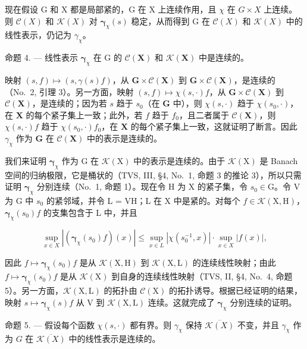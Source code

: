 现在假设 G 和 X 都是局部紧的，G 在 X 上连续作用，且 \(\chi\) 在 \(G \times X\) 上连续。则 \(\mathcal{C}(X)\) 和 \(\mathcal{K}(X)\) 对 \(\boldsymbol{\gamma}_{\chi}(s)\) 稳定，从而得到 G 在 \(\mathcal{C}(X)\) 和 \(\mathcal{K}(X)\) 中的线性表示，仍记为 \(\gamma_{\chi}\)。

命题 4. --- 线性表示 \(\pmb{\gamma}_{\chi}\) 在 G 的 \(\mathcal{C}(\mathbf{X})\) 和 \(\mathcal{K}(\mathbf{X})\) 中是连续的。

映射 \((s, f) \mapsto (s, \gamma(s)f)\)，从 \(\mathbf{G} \times \mathcal{C}(\mathbf{X})\) 到 \(\mathbf{G} \times \mathcal{C}(\mathbf{X})\)，是连续的（No.~2, 引理 3）。另一方面，映射 \((s, f) \mapsto \chi(s, \cdot)f\)，从 \(\mathbf{G} \times \mathcal{C}(\mathbf{X})\) 到 \(\mathcal{C}(\mathbf{X})\)，是连续的；因为若 \(s\) 趋于 \(s_0\)（在 \(\mathbf{G}\) 中），则 \(\chi(s, \cdot)\) 趋于 \(\chi(s_0, \cdot)\)，在 \(\mathbf{X}\) 的每个紧子集上一致；此外，若 \(f\) 趋于 \(f_0\)，且二者属于 \(\mathcal{C}(\mathbf{X})\)，则 \(\chi(s, \cdot)f\) 趋于 \(\chi(s_0, \cdot)f_0\)，在 \(\mathbf{X}\) 的每个紧子集上一致，这就证明了断言。因此 \(\gamma_{\chi}\) 作为 \(\mathbf{G}\) 在 \(\mathcal{C}(\mathbf{X})\) 中的表示是连续的。

我们来证明 \(\pmb{\gamma}_{\chi}\) 作为 G 在 \(\mathcal{K}(\mathrm{X})\) 中的表示是连续的。由于 \(\mathcal{K}(\mathrm{X})\) 是 Banach 空间的归纳极限，它是桶状的（TVS, III, §4, No.~1, 命题 3 的推论 3），所以只需证明 \(\pmb{\gamma}_{\chi}\) 分别连续（No.~1, 命题 1）。现在令 H 为 X 的紧子集，令 \(s_0 \in \mathrm{G}\)。令 V 为 G 中 \(s_0\) 的紧邻域，并令 L = VH；L 在 X 中是紧的。对每个 \(f \in \mathcal{K}(\mathrm{X}, \mathrm{H})\)，\(\pmb{\gamma}_{\chi}(s_0)f\) 的支集包含于 L 中，并且

\[
\sup _ {x \in X} | (\boldsymbol {\gamma} _ {\chi} (s _ {0}) f) (x) | \leqslant \sup _ {x \in L} | \chi (s _ {0} ^ {- 1}, x) | \cdot \sup _ {x \in X} | f (x) |,
\]

因此 \(f \mapsto \boldsymbol{\gamma}_{\chi}(s_0)f\) 是从 \(\mathcal{K}(\mathrm{X},\mathrm{H})\) 到 \(\mathcal{K}(\mathrm{X},\mathrm{L})\) 的连续线性映射；由此 \(f \mapsto \boldsymbol{\gamma}_{\chi}(s_0)f\) 是从 \(\mathcal{K}(\mathrm{X})\) 到自身的连续线性映射（TVS, II, §4, No.~4, 命题 5）。另一方面，\(\mathcal{K}(\mathrm{X},\mathrm{L})\) 的拓扑由 \(\mathcal{C}(\mathrm{X})\) 的拓扑诱导。根据已经证明的结果，映射 \(s \mapsto \boldsymbol{\gamma}_{\chi}(s)f\) 从 \(\mathrm{V}\) 到 \(\mathcal{K}(\mathrm{X},\mathrm{L})\) 连续。这就完成了 \(\boldsymbol{\gamma}_{\chi}\) 分别连续的证明。

命题 5. --- 假设每个函数 \(\chi(s,\cdot)\) 都有界。则 \(\gamma_{\chi}\) 保持 \(\overline{\mathcal{K}(X)}\) 不变，并且 \(\gamma_{\chi}\) 作为 \(G\) 在 \(\overline{\mathcal{K}(X)}\) 中的线性表示是连续的。

